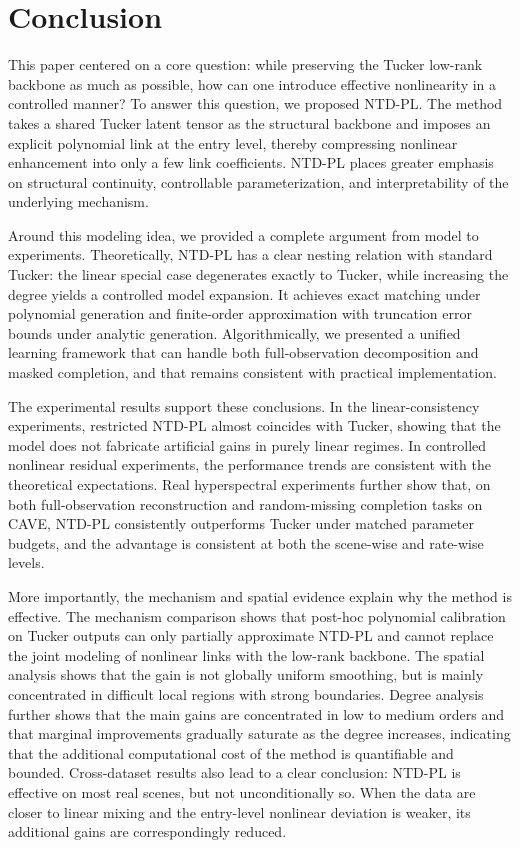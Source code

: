 \section{Conclusion}
\label{sec:conclusion}

This paper centered on a core question: while preserving the Tucker low-rank backbone as much as possible, how can one introduce effective nonlinearity in a controlled manner? To answer this question, we proposed NTD-PL. The method takes a shared Tucker latent tensor as the structural backbone and imposes an explicit polynomial link at the entry level, thereby compressing nonlinear enhancement into only a few link coefficients. NTD-PL places greater emphasis on structural continuity, controllable parameterization, and interpretability of the underlying mechanism.

Around this modeling idea, we provided a complete argument from model to experiments. Theoretically, NTD-PL has a clear nesting relation with standard Tucker: the linear special case degenerates exactly to Tucker, while increasing the degree yields a controlled model expansion. It achieves exact matching under polynomial generation and finite-order approximation with truncation error bounds under analytic generation. Algorithmically, we presented a unified learning framework that can handle both full-observation decomposition and masked completion, and that remains consistent with practical implementation.

The experimental results support these conclusions. In the linear-consistency experiments, restricted NTD-PL almost coincides with Tucker, showing that the model does not fabricate artificial gains in purely linear regimes. In controlled nonlinear residual experiments, the performance trends are consistent with the theoretical expectations. Real hyperspectral experiments further show that, on both full-observation reconstruction and random-missing completion tasks on CAVE, NTD-PL consistently outperforms Tucker under matched parameter budgets, and the advantage is consistent at both the scene-wise and rate-wise levels.

More importantly, the mechanism and spatial evidence explain why the method is effective. The mechanism comparison shows that post-hoc polynomial calibration on Tucker outputs can only partially approximate NTD-PL and cannot replace the joint modeling of nonlinear links with the low-rank backbone. The spatial analysis shows that the gain is not globally uniform smoothing, but is mainly concentrated in difficult local regions with strong boundaries. Degree analysis further shows that the main gains are concentrated in low to medium orders and that marginal improvements gradually saturate as the degree increases, indicating that the additional computational cost of the method is quantifiable and bounded. Cross-dataset results also lead to a clear conclusion: NTD-PL is effective on most real scenes, but not unconditionally so. When the data are closer to linear mixing and the entry-level nonlinear deviation is weaker, its additional gains are correspondingly reduced.

